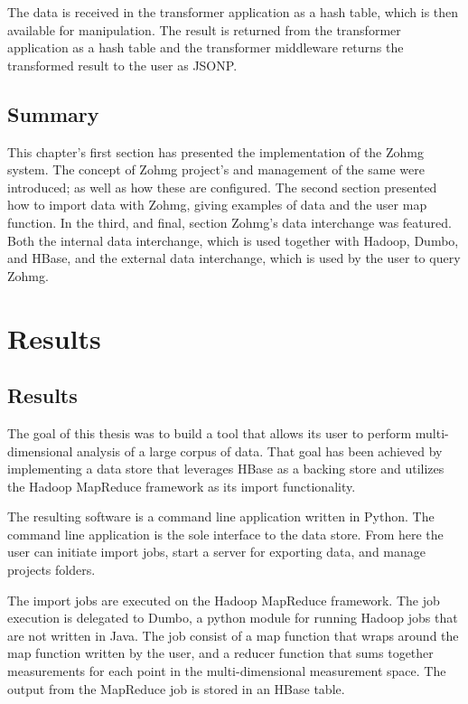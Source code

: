 The data is received in the transformer application as a hash table, which is
then available for manipulation. The result is returned from the transformer
application as a hash table and the transformer middleware returns the
transformed result to the user as JSONP.



\section*{Summary}

This chapter's first section has presented the implementation of the Zohmg
system. The concept of Zohmg project's and management of the same were
introduced; as well as how these are configured. The second section presented
how to import data with Zohmg, giving examples of data and the user map
function. In the third, and final, section Zohmg's data interchange was
featured. Both the internal data interchange, which is used together with
Hadoop, Dumbo, and HBase, and the external data interchange, which is used by
the user to query Zohmg.



\chapter{Results}


\section{Results}


The goal of this thesis was to build a tool that allows its user to perform
multi-dimensional analysis of a large corpus of data. That goal has been
achieved by implementing a data store that leverages HBase as a backing store
and utilizes the Hadoop MapReduce framework as its import functionality.

The resulting software is a command line application written in Python. The
command line application is the sole interface to the data store. From here the
user can initiate import jobs, start a server for exporting data, and manage
projects folders.

The import jobs are executed on the Hadoop MapReduce framework. The job
execution is delegated to Dumbo, a python module for running Hadoop jobs that
are not written in Java. The job consist of a map function that wraps around the
map function written by the user, and a reducer function that sums together
measurements for each point in the multi-dimensional measurement space. The
output from the MapReduce job is stored in an HBase table.

